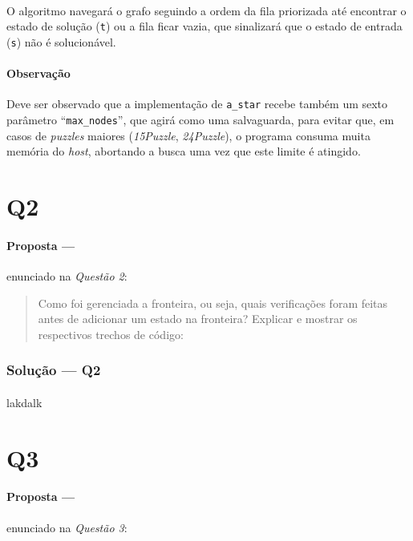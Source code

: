 \documentclass[12pt]{article}
\begin{document}
\paragraph{}
O algoritmo navegará o grafo seguindo a ordem da fila priorizada até encontrar o estado de solução (\texttt{t}) ou a
fila ficar vazia, que sinalizará que o estado de entrada (\texttt{s}) não é solucionável.

\paragraph{Observação}
Deve ser observado que a implementação de \texttt{a\_star} recebe também um sexto parâmetro ``\texttt{max\_nodes}'', que
agirá como uma salvaguarda, para evitar que, em casos de \textit{puzzles} maiores (\textit{15Puzzle},
\textit{24Puzzle}), o programa consuma muita memória do \textit{host}, abortando a busca uma vez que este limite é
atingido.

\section{Q2}

\paragraph{Proposta ---} enunciado na \textit{Questão 2}:

\begin{quote}
Como foi gerenciada a fronteira, ou seja, quais verificações foram feitas antes de adicionar um estado na fronteira? Explicar e mostrar os respectivos trechos de código:
\end{quote}

\subsubsection{Solução --- \textbf{Q2}}

\paragraph{}
lakdalk

\section{Q3}

\paragraph{Proposta ---} enunciado na \textit{Questão 3}:
\end{document}

